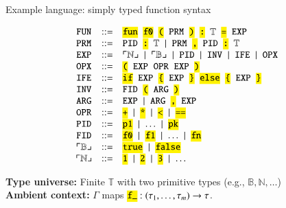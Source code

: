 \documentclass{beamer}
\newcommand{\codett}[1]{\texttt{\hl{#1}}}
\newcommand{\nt}[1]{\texttt{#1}}      %
\newcommand{\tok}[1]{\codett{#1}}     %
\newcommand{\gap}{\;\;}
\newcommand{\T}{\mathbb{T}}
\newcommand{\ttus}{\_}   %
\begin{document}
\begin{frame}{Example language: simply typed function syntax}
  \vspace{-0.25cm}

  \[
    \hspace{-0.1cm}\begin{array}{ccl}
     \nt{FUN} & ::= & \tok{fun}\gap \tok{f0}\gap \tok{(}\gap \nt{PRM}\gap \tok{)}\gap \tok{:}\gap \mathbb{T} \gap \tok{=}\gap \nt{EXP} \\
     \nt{PRM} & ::= & \nt{PID}\gap \tok{:}\gap \mathbb{T} \;\mid\; \nt{PRM}\gap \tok{,}\gap \nt{PID}\gap \tok{:}\gap \mathbb{T} \\
     \nt{EXP} & ::= & \ulcorner\mathbb{N}\lrcorner \;\mid\; \ulcorner\mathbb{B}\lrcorner \;\mid\; \nt{PID} \;\mid\; \nt{INV} \;\mid\; \nt{IFE} \;\mid\; \nt{OPX}\\
     \nt{OPX} & ::= & \codett{(}\gap\nt{EXP}\gap \nt{OPR}\gap \nt{EXP}\gap\codett{)} \\
     \nt{IFE} & ::= & \tok{if}\gap \nt{EXP}\gap \tok{\{}\gap \nt{EXP}\gap \tok{\}}\gap
     \tok{else}\gap \tok{\{}\gap \nt{EXP}\gap \tok{\}} \\
     \nt{INV} & ::= & \nt{FID}\gap \tok{(}\gap \nt{ARG}\gap \tok{)} \\
     \nt{ARG} & ::= & \nt{EXP} \;\mid\; \nt{ARG}\gap \tok{,}\gap \nt{EXP} \\
     \nt{OPR} & ::= & \tok{+} \;\mid\; \tok{*} \;\mid\; \tok{<} \;\mid\; \tok{==} \\
     \nt{PID} & ::= & \tok{p1} \;\mid\; \ldots \;\mid\; \tok{pk} \\
     \nt{FID} & ::= & \tok{f0} \;\mid\; \tok{f1} \;\mid\; \ldots \;\mid\; \tok{fn}\\
     \ulcorner\mathbb{B}\lrcorner & ::= & \tok{true} \;\mid\; \tok{false}\\
     \ulcorner\mathbb{N}\lrcorner & ::= & \tok{1} \;\mid\; \tok{2} \;\mid\; \tok{3} \;\mid\; \ldots
    \end{array}
  \]

  \vspace{0.3cm}
  \textbf{Type universe:} Finite $\T$ with two primitive types (e.g., $\mathbb{B},\mathbb{N},\ldots$)\\\vspace{1em}
  \textbf{Ambient context:} $\Gamma$ maps $\tok{f\ttus}:(\tau_1,\ldots,\tau_m)\to\tau$.
\end{frame}
\end{document}

